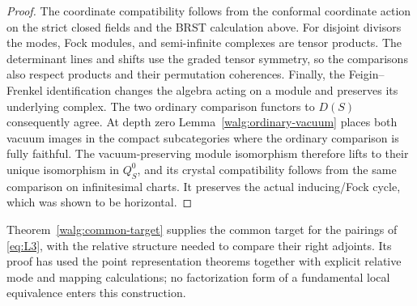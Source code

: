 \begin{proof}
The coordinate compatibility follows from the conformal coordinate
action on the strict closed fields and the BRST calculation above.
For disjoint divisors the modes, Fock modules, and semi-infinite
complexes are tensor products.  The determinant lines and shifts use
the graded tensor symmetry, so the comparisons also respect products
and their permutation coherences.  Finally, the Feigin--Frenkel
identification changes the algebra acting on a module and preserves
its underlying complex.  The two ordinary comparison functors to
\(D(S)\) consequently agree.  At depth zero
Lemma~\ref{walg:ordinary-vacuum} places both vacuum images in the compact subcategories where the ordinary comparison is
fully faithful.  The vacuum-preserving module isomorphism therefore
lifts to their unique isomorphism in \(Q_S^0\), and its crystal
compatibility follows from the same comparison on infinitesimal
charts.  It preserves the actual inducing/Fock cycle, which was
shown to be horizontal.
\end{proof}

Theorem~\ref{walg:common-target} supplies the common target for the
pairings of \eqref{eq:L3}, with the relative structure needed to
compare their right adjoints.  Its proof has used the point
representation theorems together with explicit relative mode and
mapping calculations; no factorization form of a fundamental local
equivalence enters this construction.
